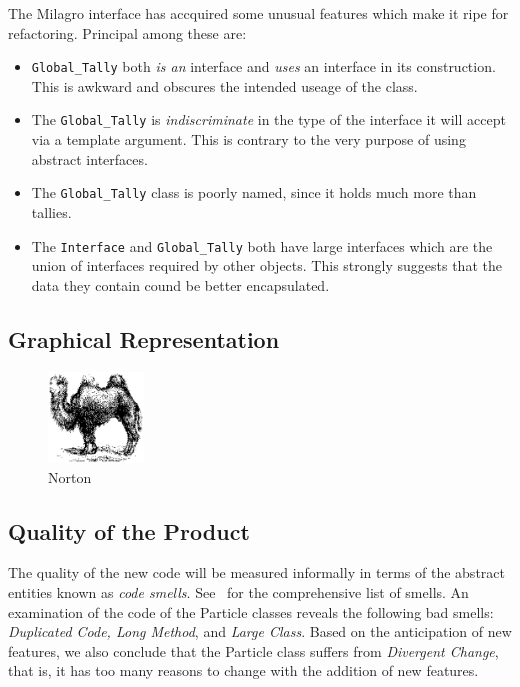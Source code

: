 \documentclass[11pt]{nmemo}
\begin{document}
The Milagro interface has accquired some unusual features which make
it ripe for refactoring. Principal among these are:

\begin{itemize}
\item {\tt Global\_Tally} both {\em is an} interface and {\em uses} an
  interface in its construction. This is awkward and obscures the
  intended useage of the class.

\item The {\tt Global\_Tally} is {\em indiscriminate} in the type of the
interface it will accept via a template argument. This is contrary to
the very purpose of using abstract interfaces.

\item The {\tt Global\_Tally} class is poorly named, since it holds much
more than tallies.

\item The {\tt Interface} and {\tt Global\_Tally} both have large
  interfaces which are the union of interfaces required by other
  objects. This strongly suggests that the data they contain cound be
  better encapsulated.

\end{itemize}

\subsection*{Graphical Representation}

\begin{figure}[h]
  \begin{center}
    \includegraphics[width=1in]{figures/camel.eps}
    \caption{Norton}
  \end{center}
\end{figure}

\subsection*{Quality of the Product}

The quality of the new code will be measured informally in terms of
the abstract entities known as {\em code smells}. See~\cite[Chapter
3]{fowler00} for the comprehensive list of smells. An examination of
the code of the Particle classes reveals the following bad smells:
{\em Duplicated Code, Long Method}, and {\em Large Class}.  Based on
the anticipation of new features, we also conclude that the Particle
class suffers from {\em Divergent Change}, that is, it has too many
reasons to change with the addition of new features. 
\end{document}
